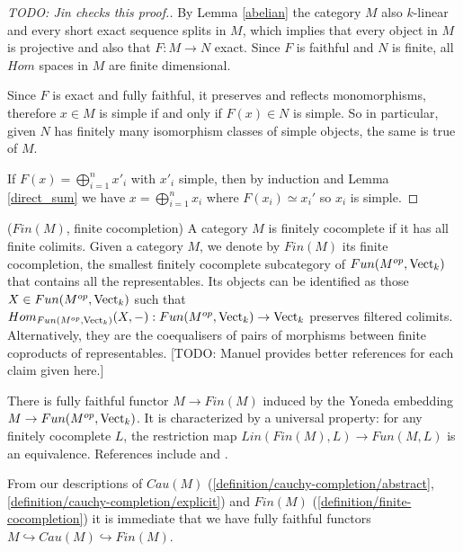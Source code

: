 \begin{proof}
  [TODO: Jin checks this proof.]

  By Lemma \ref{abelian} the category $M$ also $k$-linear and every short exact sequence splits in $M$, which implies that every object in $M$ is projective and also that $F:M\to N$ exact. Since $F$ is faithful and $N$ is finite, all $Hom$ spaces in $M$ are finite dimensional.

  Since $F$ is exact and fully faithful, it preserves and reflects
  monomorphisms, therefore $x\in M$ is simple if and only if $F(x)\in N$ is
  simple. So in particular, given $N$ has finitely many isomorphism classes of
  simple objects, the same is true of $M$.

  If $F(x)=\bigoplus_{i=1}^n x'_i$ with $x'_i$ simple, then by induction and
  Lemma \ref{direct_sum} we have $x=\bigoplus_{i=1}^n x_i$ where
  $F(x_i)\simeq x_i'$ so $x_i$ is simple.
\end{proof}

\begin{definition} \label{definition/finite-cocompletion} ($Fin(M)$, finite cocompletion)
  A category $M$ is finitely cocomplete if it has all finite colimits. Given a
  category $M$, we denote by $Fin(M)$ its finite cocompletion, the
  smallest finitely cocomplete subcategory of $Fun(M^{op},\operatorname{Vect}_k)$ that
  contains all the representables. Its objects can be identified as those
  $X\in Fun(M^{op},\operatorname{Vect}_k)$ such that
  $Hom_{Fun(M^{op},\operatorname{Vect}_k)}(X,-):Fun(M^{op},\operatorname{Vect}_k)\to \operatorname{Vect}_k$ preserves filtered
  colimits. Alternatively, they are the coequalisers of pairs of morphisms
  between finite coproducts of representables. [TODO: Manuel provides better references for each claim given here.]

  There is fully
  faithful functor $M\to Fin(M)$ induced by the Yoneda embedding $M \to Fun(M^{op}, \operatorname{Vect}_{k})$. It is characterized by a universal
  property: for any finitely cocomplete $L$, the restriction map
  $Lin(Fin(M),L)\to Fun(M,L)$ is an equivalence. References include
  \cite[Section 5.7]{kelly/basic-concepts-enriched} and \cite[Section
  2.2.1]{lopezfranco/tensor-products}.
\end{definition}

\begin{remark}
  From our descriptions of $Cau(M)$
  (\ref{definition/cauchy-completion/abstract},
  \ref{definition/cauchy-completion/explicit}) and $Fin(M)$
  (\ref{definition/finite-cocompletion}) it is immediate that we have fully
  faithful functors $M\hookrightarrow Cau(M)\hookrightarrow Fin(M)$.
\end{remark}

